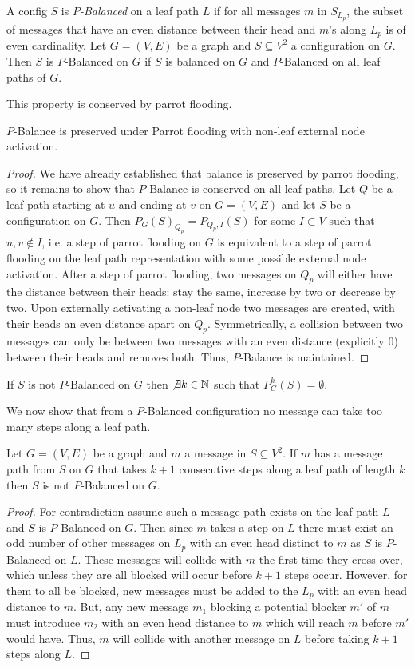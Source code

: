 \begin{definition}
    A config $S$ is \emph{$P$-Balanced} on a leaf path $L$ if for all messages $m$ in $S_{L_p}$, the subset of messages that have an even distance between their head and $m$'s along $L_{p}$ is of even cardinality.
    Let $G=(V,E)$ be a graph and $S\subseteq V^2$ a configuration on $G$. Then $S$ is $P$-Balanced on $G$ if $S$ is balanced on $G$ and $P$-Balanced on all leaf paths of $G$.
\end{definition}
This property is conserved by parrot flooding.
\begin{lemma}
    $P$-Balance is preserved under Parrot flooding with non-leaf external node activation.
\end{lemma}
\begin{proof}
    We have already established that balance is preserved by parrot flooding, so it remains to show that $P$-Balance is conserved on all leaf paths.
    Let $Q$ be a leaf path starting at $u$ and ending at $v$ on $G=(V,E)$ and let $S$ be a configuration on $G$.
    Then $P_G(S)_{Q_{p}}=P_{Q_p,I}(S)$ for some $I \subset V$ such that $u,v \not\in I$, i.e. a step of parrot flooding on $G$ is equivalent to a step of parrot flooding on the leaf path representation with some possible external node activation.
    After a step of parrot flooding, two messages on $Q_p$ will either have the distance between their heads: stay the same, increase by two or decrease by two.
    Upon externally activating a non-leaf node two messages are created, with their heads an even distance apart on $Q_p$.
    Symmetrically, a collision between two messages can only be between two messages with an even distance (explicitly $0$) between their heads and removes both.
    Thus, $P$-Balance is maintained.
\end{proof}
\begin{corollary}
    If $S$ is not $P$-Balanced on $G$ then $\not\exists k \in \mathbb{N}$ such that $P_G^k(S)=\emptyset$.
\end{corollary}
We now show that from a $P$-Balanced configuration no message can take too many steps along a leaf path.
\begin{lemma}
    Let $G=(V,E)$ be a graph and $m$ a message in $S\subseteq V^2$. If $m$ has a message path from $S$ on $G$ that takes $k+1$ consecutive steps along a leaf path of length $k$ then $S$ is not $P$-Balanced on $G$.
\end{lemma}
\begin{proof}
    For contradiction assume such a message path exists on the leaf-path $L$ and $S$ is $P$-Balanced on $G$. Then since $m$ takes a step on $L$ there must exist an odd number of other messages on $L_p$ with an even head distinct to $m$ as $S$ is $P$-Balanced on $L$.
    These messages will collide with $m$ the first time they cross over, which unless they are all blocked will occur before $k+1$ steps occur. 
    However, for them to all be blocked, new messages must be added to the $L_p$ with an even head distance to $m$. 
    But, any new message $m_1$ blocking a potential blocker $m'$ of $m$ must introduce $m_2$ with an even head distance to $m$ which will reach $m$ before $m'$ would have.
    Thus, $m$ will collide with another message on $L$ before taking $k+1$ steps along $L$.
\end{proof}
